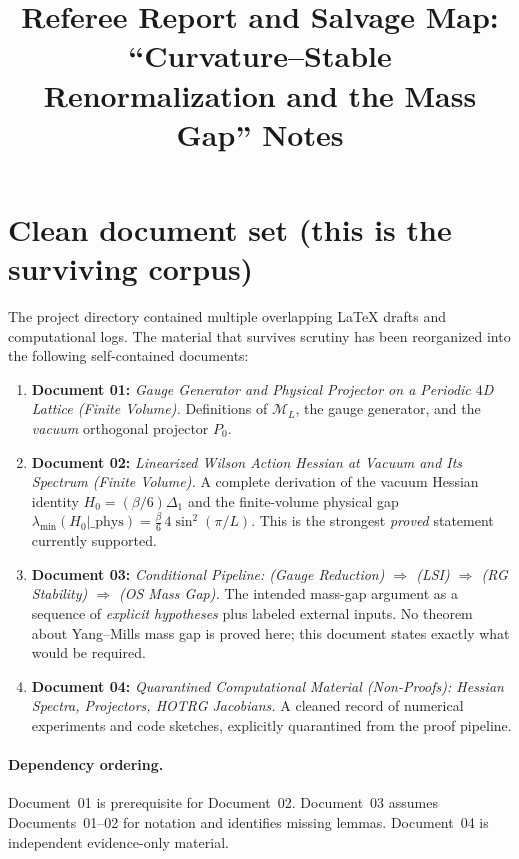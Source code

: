 \documentclass[11pt]{article}
\title{Referee Report and Salvage Map: ``Curvature--Stable Renormalization and the Mass Gap'' Notes}
\date{}
\begin{document}
\maketitle

\section{Clean document set (this is the surviving corpus)}

The project directory contained multiple overlapping LaTeX drafts and computational logs.
The material that survives scrutiny has been reorganized into the following self-contained documents:

\begin{enumerate}[leftmargin=*]
\item \textbf{Document 01:} \emph{Gauge Generator and Physical Projector on a Periodic $4$D Lattice (Finite Volume).}
Definitions of $\mathcal M_L$, the gauge generator, and the \emph{vacuum} orthogonal projector $P_0$.

\item \textbf{Document 02:} \emph{Linearized Wilson Action Hessian at Vacuum and Its Spectrum (Finite Volume).}
A complete derivation of the vacuum Hessian identity
$H_0=(\beta/6)\Delta_1$ and the finite-volume physical gap
$\lambda_{\min}(H_0|\_{\mathrm{phys}})=\frac{\beta}{6}\,4\sin^2(\pi/L)$.
This is the strongest \emph{proved} statement currently supported.

\item \textbf{Document 03:} \emph{Conditional Pipeline: (Gauge Reduction) $\Rightarrow$ (LSI) $\Rightarrow$ (RG Stability) $\Rightarrow$ (OS Mass Gap).}
The intended mass-gap argument as a sequence of \emph{explicit hypotheses} plus labeled external inputs.
No theorem about Yang--Mills mass gap is proved here; this document states exactly what would be required.

\item \textbf{Document 04:} \emph{Quarantined Computational Material (Non-Proofs): Hessian Spectra, Projectors, HOTRG Jacobians.}
A cleaned record of numerical experiments and code sketches, explicitly quarantined from the proof pipeline.
\end{enumerate}

\paragraph{Dependency ordering.}
Document~01 is prerequisite for Document~02.
Document~03 assumes Documents~01--02 for notation and identifies missing lemmas.
Document~04 is independent evidence-only material.
\end{document}
